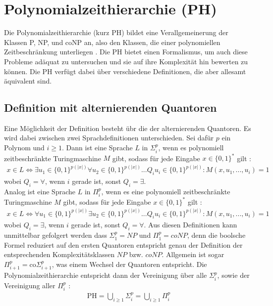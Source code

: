 \chapter{Polynomialzeithierarchie (PH)} \label{chapter: Polynomialzeithierarchie (PH)}
Die Polynomialzeithierarchie (kurz PH) bildet eine Verallgemeinerung der Klassen P, NP, und coNP an, also den Klassen, die einer 
polynomiellen Zeitbeschränkung unterliegen \cite{aaronson_scott_2016}. Die PH bietet einen Formalismus, um auch diese Probleme adäquat zu untersuchen und sie auf ihre Komplexität hin bewerten zu können.
Die PH verfügt dabei über verschiedene Definitionen, die aber allesamt äquivalent sind.


\section{Definition mit alternierenden Quantoren} \label{section: Definition PH mit alternierenden Quantoren}
Eine Möglichkeit der Definition besteht übr die der alternierenden Quantoren. Es wird dabei zwischen zwei Sprachdefinitionen unterschieden.
Sei dafür $p$ ein Polynom und $i \geq 1$. Dann ist eine Sprache $L$ in $\Sigma^p_i$, wenn es polynomiell zeitbeschränkte Turingmaschine $M$ gibt, 
sodass für jede Eingabe $x \in \{0,1\}^*$ gilt \cite{rossman_complexity_2015}:
\begin{align*}
    x \in L \Leftrightarrow \exists u_1 \in \{0,1\}^{p(|x|)} \forall u_2 \in \{0,1\}^{p(|x|)} ... Q_i u_i \in \{0,1\}^{p(|x|)} : M(x, u_1, ..., u_i) = 1
\end{align*}
wobei $Q_i = \forall$, wenn $i$ gerade ist, sonst $Q_i = \exists$. \\
Analog ist eine Sprache $L$ in $\Pi^p_i$, wenn es eine polynomiell zeitbeschränkte Turingmaschine $M$ gibt, sodass für jede Eingabe $x \in \{0,1\}^*$ gilt \cite{arora_computational_2009}:
\begin{align*}
    x \in L \Leftrightarrow \forall u_1 \in \{0,1\}^{p(|x|)} \exists u_2 \in \{0,1\}^{p(|x|)} ... Q_i u_i \in \{0,1\}^{p(|x|)} : M(x, u_1, ..., u_i) = 1
\end{align*}
wobei $Q_i = \exists$, wenn $i$ gerade ist, sonst $Q_i = \forall$.
Aus diesen Definitionen kann unmittelbar gefolgert werden dass $\Sigma^p_1 = NP$ und $\Pi^p_1 = coNP$, denn die boolsche Formel reduziert auf 
den ersten Quantoren entspricht genau der Definition der entsprechenden Komplexitätsklassen $NP$ bzw. $coNP$.
Allgemein ist sogar $\Pi^p_{i+1} = \text{co}\Sigma^p_{i+1}$, was einem Wechsel der Quantoren entspricht.
Die Polynomialzeithierarchie entspricht dann der Vereinigung über alle $\Sigma^p_i$, sowie der Vereinigung aller $\Pi^p_i$ \cite{sipser_introduction_2012}:
\begin{align*}
    \text{PH} = \bigcup_{i \geq 1} \Sigma^p_i = \bigcup_{i \geq 1} \Pi^p_i 
\end{align*}
